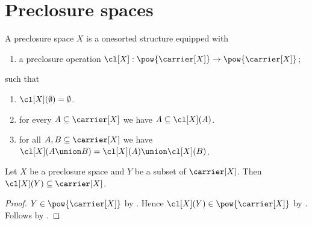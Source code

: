 


\section{Preclosure spaces}

\begin{struct}\label{preclosure_space}
    A preclosure space $X$ is a onesorted structure equipped with
    \begin{enumerate}
        \item\label{preclosure_graph}
            a preclosure operation
            $\cl[X]:\pow{\carrier[X]}\to\pow{\carrier[X]}$;
    \end{enumerate}
    such that
    \begin{enumerate}
        \item\label{preclosure_empty}
            $\cl[X](\emptyset)=\emptyset$.
        \item\label{preclosure_extensive}
            for every $A\subseteq\carrier[X]$ we have
                $A\subseteq\cl[X](A)$.
        \item\label{preclosure_union}
            for all $A,B\subseteq\carrier[X]$ we have
                $\cl[X](A\union B)=\cl[X](A)\union\cl[X](B)$.
    \end{enumerate}
\end{struct}

\begin{proposition}\label{preclosure_type}
    Let $X$ be a preclosure space and
        $Y$ be a subset of $\carrier[X]$.
    Then $\cl[X](Y)\subseteq\carrier[X]$.
\end{proposition}
\begin{proof}
    $Y\in\pow{\carrier[X]}$ by .
    Hence $\cl[X](Y)\in\pow{\carrier[X]}$
        by .
    Follows by .
\end{proof}
